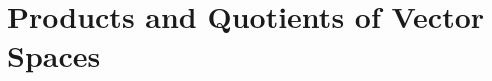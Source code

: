 \section{Products and Quotients of Vector Spaces}

\begin{exercise}
    \td \\
\end{exercise}

\begin{solution}
    \\ \td \\
\end{solution}